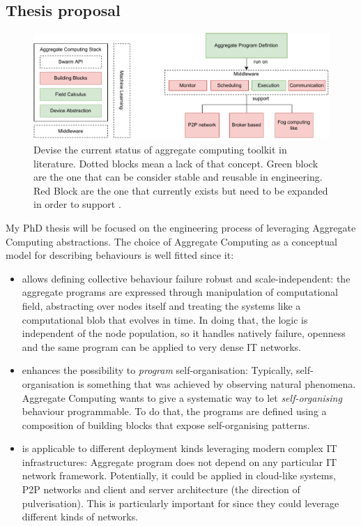 \documentclass[11pt]{article}
\begin{document}
\subsection{Thesis proposal}
\begin{figure}
	\centering
	\includegraphics[width=\textwidth]{img/to-do-for-thesis.pdf}
	\caption{Devise the current status of aggregate computing toolkit in literature. Dotted blocks mean a lack of that concept. Green block are the one that can be consider stable and reusable in \cpsw{} engineering. Red Block are the one that currently exists but need to be expanded in order to support \cpsw{}.}
	\label{fig:current-state}
\end{figure}
My PhD thesis will be focused on the engineering process of \cpsw{} leveraging Aggregate Computing abstractions. The choice of Aggregate Computing as a conceptual model for describing \cpsw{} behaviours is well fitted since it:
\begin{itemize}
	\item allows defining collective behaviour failure robust and scale-independent: the aggregate programs are expressed through manipulation of computational field, abstracting over nodes itself and treating the systems like a computational blob that evolves in time. In doing that, the logic is independent of the node population, so it handles natively failure, openness and the same program can be applied to very dense IT networks.
	\item enhances the possibility to \textit{program} self-organisation: Typically, self-organisation is something that was achieved by observing natural phenomena. Aggregate Computing wants to give a systematic way to let \textit{self-organising} behaviour programmable. To do that, the programs are defined using a composition of building blocks that expose self-organising patterns.
	\item is applicable to different deployment kinds leveraging modern complex IT infrastructures: Aggregate program does not depend on any particular IT network framework. Potentially, it could be applied in cloud-like systems, P2P networks and client and server architecture (the direction of pulverisation). This is particularly important for \cpsw{} since they could leverage different kinds of networks.
\end{itemize}
\end{document}
